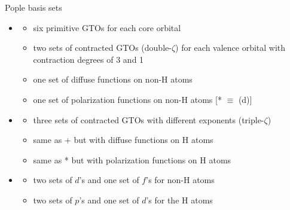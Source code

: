 \documentclass[aspectratio=169,9pt]{beamer}
\newcommand{\red}[1]{\textcolor{hfRed}{#1}}
\newcommand{\orange}[1]{\textcolor{hfOrange}{#1}}
\newcommand{\green}[1]{\textcolor{hfGreen}{#1}}
\newcommand{\violet}[1]{\textcolor{hfViolet}{#1}}
\begin{document}
\begin{frame}{Pople basis sets}
	\begin{itemize}
		\item \Large \fbox{\red{6}-\orange{31}\violet{+}G$^{\green{*}}$}
		\bigskip
    	\begin{itemize} \normalsize
    		\item{\makebox[1cm]{\red{6}\hfill}} six primitive GTOs for each core orbital
    		\item{\makebox[1cm]{\orange{31}\hfill}} two sets of contracted GTOs (double-$\zeta$) for each valence orbital with contraction degrees of 3 and 1
    		\item{\makebox[1cm]{\violet{+}\hfill}} one set of diffuse functions on non-H atoms
    		\item{\makebox[1cm]{\green{*}\hfill}} one set of polarization functions on non-H atoms [\green{*} $\equiv$ \green{(d)}]
    	\end{itemize}
		\bigskip
		\item \fbox{\red{6}-\orange{311}\violet{++}G$^{\green{**}}$}
		\bigskip
    	\begin{itemize} \normalsize
    		\item{\makebox[1cm]{\orange{311}\hfill}} three sets of contracted GTOs with different exponents (triple-$\zeta$)
    		\item{\makebox[1cm]{\violet{++}\hfill}} same as \violet{+} but with diffuse functions on H atoms
    		\item{\makebox[1cm]{\green{**}\hfill}} same as \green{*} but with polarization functions on H atoms
    	\end{itemize}
		\bigskip
		\item \fbox{\red{6}-\orange{311}G\green{(2df,2pd)}}
		\bigskip
    	\begin{itemize} \normalsize
    		\item{\makebox[1cm]{\green{2df}\hfill}} two sets of $d$'s and one set of $f$'s for non-H atoms
    		\item{\makebox[1cm]{\green{2pd}\hfill}} two sets of $p$'s and one set of $d$'s for the H atoms
    	\end{itemize}
	\end{itemize}
\end{frame}
\end{document}
